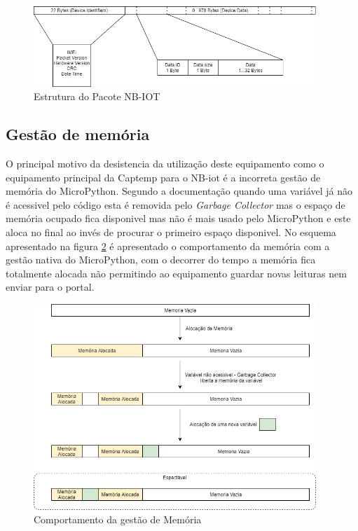  \begin{figure}[ht]
\centering
\includegraphics[width=0.95\textwidth]{images/packetnb.png}
\caption{Estrutura do Pacote NB-IOT}\label{packet}
\end{figure}

\subsection {Gestão de memória}

\par O principal motivo da desistencia da utilização deste equipamento como o equipamento principal da Captemp para o NB-iot é a incorreta gestão de memória do MicroPython. Segundo a documentação quando uma variável já não é acessivel pelo código esta é removida pelo \textit{Garbage Collector} mas o espaço de memória  ocupado fica disponivel mas não é mais usado pelo MicroPython e este aloca no final ao invés de procurar o primeiro espaço disponivel. No esquema apresentado na figura \ref{memo} é apresentado o comportamento da memória com a gestão nativa do MicroPython, com o decorrer do tempo a memória fica totalmente alocada não permitindo ao equipamento guardar novas leituras nem enviar para o portal.


 \begin{figure}[ht]
\centering
\includegraphics[width=0.95\textwidth]{images/memo.png}
\caption{Comportamento da gestão de Memória}\label{memo}
\end{figure}



